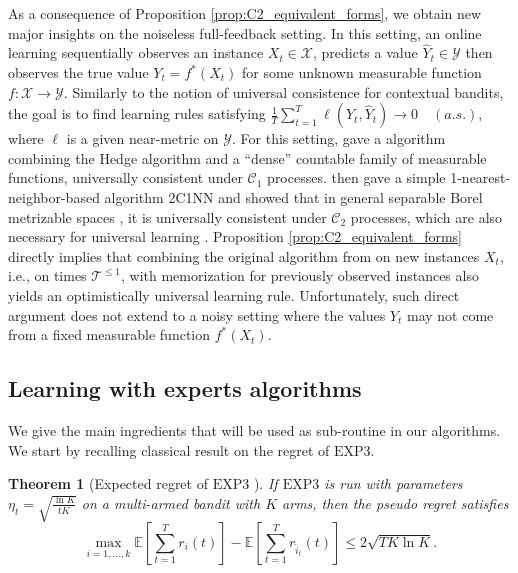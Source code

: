 \documentclass[aos]{imsart}
\theoremstyle{plain}
\newtheorem{theorem}{Theorem}[section]
\theoremstyle{remark}
\newcommand{\Ccal}{\mathcal{C}}
\newcommand{\Tcal}{\mathcal{T}}
\newcommand{\Xcal}{\mathcal{X}}
\newcommand{\Ycal}{\mathcal{Y}}
\newcommand{\Ebb}{\mathbb{E}}
\newcommand{\1}{\mathbbm{1}}%
\newcommand{\EXP}{\mathrm{EXP3}}
\begin{document}
As a consequence of Proposition \ref{prop:C2_equivalent_forms}, we obtain new major insights on the noiseless full-feedback setting. In this setting, an online learning sequentially observes an instance $X_t\in\Xcal$, predicts a value $\hat Y_t\in\Ycal$ then observes the true value $Y_t=f^*(X_t)$ for some unknown measurable function $f:\Xcal\to\Ycal$. Similarly to the notion of universal consistence for contextual bandits, the goal is to find learning rules satisfying $\frac{1}{T}\sum_{t=1}^T \ell(Y_t,\hat Y_t) \to 0\quad(a.s.),$ where $\ell$ is a given near-metric on $\Ycal$. For this setting, \citep{hanneke:21} gave a algorithm combining the Hedge algorithm and a ``dense'' countable family of measurable functions, universally consistent under $\Ccal_1$ processes. \citep{blanchard:22a} then gave a simple 1-nearest-neighbor-based algorithm 2C1NN and showed that in general separable Borel metrizable spaces \cite{blanchard:22c}, it is universally consistent under $\Ccal_2$ processes, which are also necessary for universal learning \citep{hanneke:21}. Proposition \ref{prop:C2_equivalent_forms} directly implies that combining the original algorithm from \citep{hanneke:21} on new instances $X_t$, i.e., on times $\Tcal^{\leq 1}$, with memorization for previously observed instances also yields an optimistically universal learning rule. Unfortunately, such direct argument does not extend to a noisy setting \cite{blanchard:22d} where the values $Y_t$ may not come from a fixed measurable function $f^*(X_t)$.

\subsection{Learning with experts algorithms}


We give the main ingredients that will be used as sub-routine in our algorithms. We start by recalling classical result on the regret of $\EXP$.

\begin{theorem}[Expected regret of $\EXP$ \citep*{bubeck2012regret}] \label{thm:exp3}
    If $\EXP$ is run with parameters $\eta_t = \sqrt{\frac{\ln K}{tK}}$ on a multi-armed bandit with $K$ arms, then the pseudo regret satisfies
    \begin{equation*}
        \max_{i=1,\ldots,k}\Ebb\left[\sum_{t=1}^T r_i(t)\right] - \Ebb\left[\sum_{t=1}^T r_{\hat i_t}(t)\right]\leq 2\sqrt{TK\ln K}.
    \end{equation*}
\end{theorem}
\end{document}
